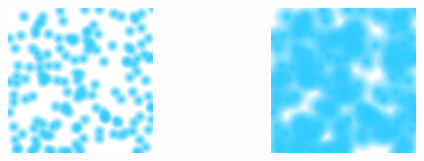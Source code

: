 \documentclass[aspectratio=169]{beamer}
\begin{document}
\begin{frame}
\begin{columns}
\begin{column}{0.32\textwidth}
\begin{figure}
\includegraphics[width=0.9\textwidth]{pictures/smoothed_particles_5.png}
\end{figure}
\end{column}

\begin{column}{0.32\textwidth}
\begin{figure}
\includegraphics[width=0.9\textwidth]{pictures/smoothed_particles_10.png}
\end{figure}
\end{column}
\end{columns}
\end{frame}
\end{document}
